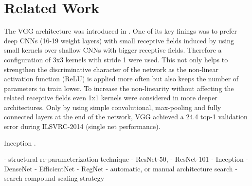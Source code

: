 \section{Related Work}

The VGG architecture was introduced in \cite{KarenSimonyan.2014}. One of its key finings was to prefer deep CNNs (16-19 weight layers) with small receptive fields induced by using small kernels over shallow CNNs with bigger receptive fields. Therefore a configuration of 3x3 kernels with stride 1 were used. This not only helps to strengthen the discriminative character of the network as the non-linear activation function (ReLU) is applied more often but also keeps the number of parameters to train lower. To increase the non-linearity without affecting the related receptive fields even 1x1 kernels were considered in more deeper architectures. Only by using simple convolutional, max-pooling and fully connected layers at the end of the network, VGG achieved a 24.4 top-1 validation error during ILSVRC-2014 (single net performance). \cite{KarenSimonyan.2014}

Inception \cite{ChristianSzegedy.2014}.


- structural re-parameterization technique
- ResNet-50,
- ResNet-101
- Inception
- DenseNet
- EfficientNet
- RegNet
- automatic, or manual architecture search
- search compound scaling strategy